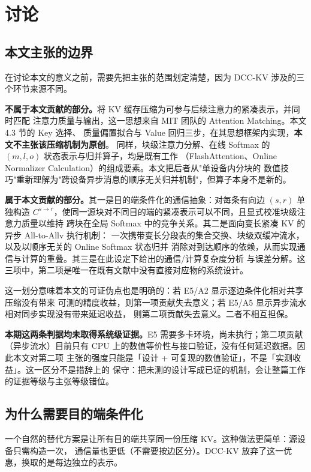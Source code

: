 \section{讨论}
\label{sec:discussion}

\subsection{本文主张的边界}

在讨论本文的意义之前，需要先把主张的范围划定清楚，因为 DCC-KV 涉及的三个环节来源不同。

\textbf{不属于本文贡献的部分。}将 KV 缓存压缩为可参与后续注意力的紧凑表示，并同时匹配
注意力质量与输出，这一思想来自 MIT 团队的 Attention Matching。本文 4.3 节的 Key 选择、
质量偏置拟合与 Value 回归三步，在其思想框架内实现，\textbf{本文不主张该压缩机制为原创}。
同样，块级注意力分解、在线 Softmax 的 $(m,l,o)$ 状态表示与归并算子，均是既有工作
（FlashAttention、Online Normalizer Calculation）的组成要素。本文把后者从"单设备内分块的
数值技巧"重新理解为"跨设备异步消息的顺序无关归并机制"，但算子本身不是新的。

\textbf{属于本文贡献的部分。}其一是目的端条件化的通信抽象：对每条有向边 $(s,r)$ 单独构造
$C^{s\to r}$，使同一源块对不同目的端的紧凑表示可以不同，且显式校准块级注意力质量以维持
跨块在全局 Softmax 中的竞争关系。其二是面向变长紧凑 KV 的异步 All-to-Allv 执行机制：
一次携带变长分段表的集合交换、块级双缓冲流水，以及以顺序无关的 Online Softmax 状态归并
消除对到达顺序的依赖，从而实现通信与计算的重叠。其三是在此设定下给出的通信/计算复杂度分析
与误差分解。这三项中，第二项是唯一在既有文献中没有直接对应物的系统设计。

这一划分意味着本文的可证伪点也是明确的：若 E5/A2 显示逐边条件化相对共享压缩没有带来
可测的精度收益，则第一项贡献失去意义；若 E5/A5 显示异步流水相对同步实现没有带来延迟收益，
则第二项贡献失去意义。二者不相互担保。

\textbf{本期这两条判据均未取得系统级证据。}E5 需要多卡环境，尚未执行；第二项贡献
（异步流水）目前只有 CPU 上的数值等价性与接口验证，没有任何延迟数据。因此本文对第二项
主张的强度只能是「设计 + 可复现的数值验证」，不是「实测收益」。这一区分不是措辞上的
保守：把未测的设计写成已证的机制，会让整篇工作的证据等级与主张等级错位。

\subsection{为什么需要目的端条件化}

一个自然的替代方案是让所有目的端共享同一份压缩 KV。这种做法更简单：源设备只需构造一次，
通信量也更低（不需要按边区分）。DCC-KV 放弃了这一优惠，换取的是每边独立的表示。

